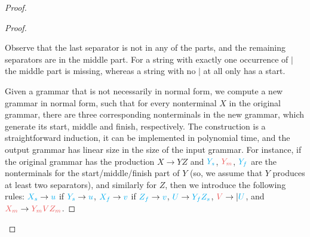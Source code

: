 \documentclass[a4paper,UKenglish,cleveref, autoref, thm-restate]{lipics-v2021}
\newcommand{\red}[1]{{\color{red}#1}}
\newcommand{\blue}[1]{{\color{cyan}#1}}
\begin{document}
\begin{proof}
\begin{proof}
   \begin{center}    
   \end{center}
        Observe that the last separator is not in any of the parts, and the remaining separators are in the middle part.
        For a string with exactly one occurrence of $|$ the middle part is missing, whereas a string with no $|$ at all only
        has a start. 
        
        Given a grammar that is not necessarily in normal form, we compute a new grammar in normal form, such that for every nonterminal $X$ in the original grammar, there are three corresponding nonterminals in the new grammar, which generate its start, middle and finish, respectively. The construction is a straightforward induction, it can be implemented in polynomial time, and the output grammar has linear size in the size of the input grammar. For instance, if the original grammar has the production $X \to YZ$ and $\blue{Y_s}$, $\red{Y_m}$, $\blue{Y_f}$ are the nonterminals for the start/middle/finish part of $Y$ (so, we assume that $Y$ produces at least two separators), 
        and similarly for $Z$, then we introduce the following rules:
         $\blue{X_s} \to \blue{u}$ if $\blue{Y_s} \to \blue{u}$,
        $\blue{X_f} \to \blue v$ if $\blue{Z_f} \to \blue v$,
        $\blue U \to \blue{Y_f Z_s}$, $\red V \to | \blue U$, and $\red{X_m} \to \red{Y_m V Z_m}$.
        

\end{proof}
\end{proof}
\end{document}
